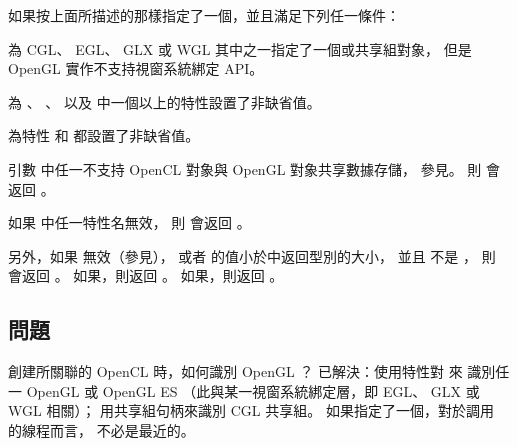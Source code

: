 如果按上面所描述的那樣指定了一個，並且滿足下列任一條件：
\startigBase[indentnext=no]
\item 為 CGL、 EGL、 GLX 或 WGL 其中之一指定了一個或共享組對象，
但是 OpenGL 實作不支持視窗系統綁定 API。

\item 為 、 、
  以及  中一個以上的特性設置了非缺省值。

\item 為特性  和  都設置了非缺省值。

\item 引數  中任一不支持 OpenCL 對象與 OpenGL 對象共享數據存儲，
參見。
\stopigBase
則  會返回 。

如果  中任一特性名無效，
則  會返回 。

另外，如果  無效（參見），
或者  的值小於中返回型別的大小，
並且  不是 ，
則  會返回 。
如果\schostfailres，則返回 。
如果\scdevfailres，則返回 。

\stopreplacepar

\subsection{問題}

\startQUESTION
創建所關聯的 OpenCL 時，如何識別 OpenGL ？
\stopQUESTION
\startANSWER
已解決：使用特性對  來
識別任一 OpenGL 或 OpenGL ES 
（此與某一視窗系統綁定層，即 EGL、 GLX 或 WGL 相關）；
用共享組句柄來識別 CGL 共享組。
如果指定了一個，對於調用  的線程而言，
不必是最近的。
\stopANSWER

